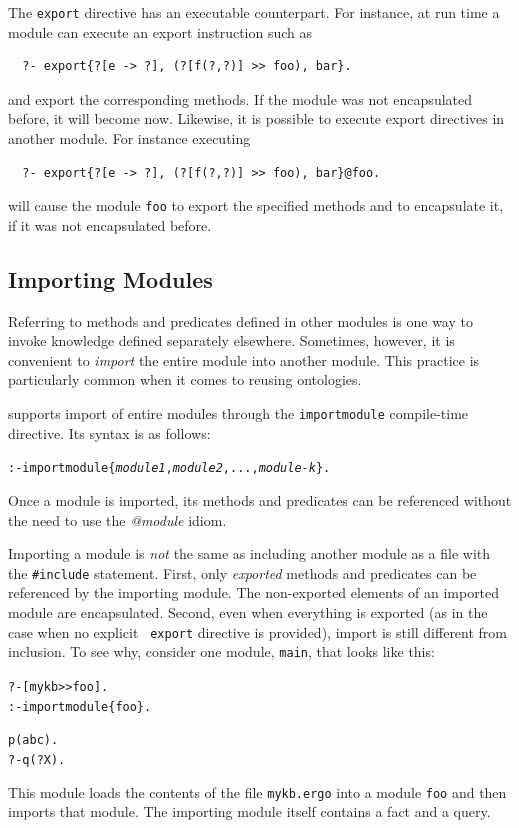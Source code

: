 \documentclass[11pt]{article}
\newcommand{\ERGO}{\mbox{\smaller{\ensuremath{\cal{E}}\smaller{{\sc{RGO}}}}}\xspace}
\newcommand{\FLSYSTEM}{\ERGO}
\newcommand{\ergoext}{ergo\xspace}
\begin{document}
The {\tt export} directive has an executable counterpart. For instance, at
run time a module can execute an export instruction such as 
\begin{verbatim}
  ?- export{?[e -> ?], (?[f(?,?)] >> foo), bar}.
\end{verbatim}
and export the corresponding methods. If the module was not encapsulated
before, it will become now. Likewise, it is possible to execute export
directives in another module. For instance executing
\begin{verbatim}
  ?- export{?[e -> ?], (?[f(?,?)] >> foo), bar}@foo.
\end{verbatim}
will cause the module {\tt foo} to export the specified methods and to
encapsulate it, if it was not encapsulated before. 


\subsection{Importing Modules}\label{sec-module-import}

Referring to methods and predicates defined in other modules is one way to
invoke knowledge defined separately elsewhere. Sometimes, however,
it is convenient to \emph{import} the entire module into another module.
This practice is particularly common when it comes to reusing ontologies.

\FLSYSTEM supports import of entire modules through the {\tt importmodule}
compile-time directive. Its syntax is as follows:

\begin{alltt}
 :- importmodule\{\textit{module1}, \textit{module2}, ..., \textit{module-k}\}.
\end{alltt}

Once a module is imported, its methods and predicates can be referenced
without the need to use the \emph{@module} idiom. 

Importing a module is \emph{not} the same as including another module as a
file with the {\tt \#include} statement. First, only \emph{exported}
methods and predicates can be referenced by the importing module.
The non-exported elements of an imported module are encapsulated.
Second,
even when everything is exported (as in the case when no explicit {\tt
  export} directive is provided), import is still different from inclusion.
To see why, consider one module, {\tt main}, that looks like this:

\begin{alltt}
  ?- [mykb>{}>foo].
  :- importmodule\{foo\}.

  p(abc).
  ?- q(?X).
\end{alltt}
This module loads the contents of the file {\tt mykb.\ergoext} into a module
{\tt foo} and then imports that module.  
The importing module itself contains a fact and a query.
\end{document}
